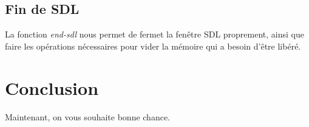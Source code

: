 \documentclass[letter]{article}
\begin{document}
\subsection{Fin de SDL}
\label{sec:orga3f22d4}

La fonction \emph{end-sdl} nous permet de fermet la fenêtre SDL proprement, ainsi que faire les opérations nécessaires pour vider la mémoire qui a besoin d'être libéré.






\section{Conclusion}
\label{sec:orge6a9472}

Maintenant, on vous souhaite bonne chance.
\end{document}
